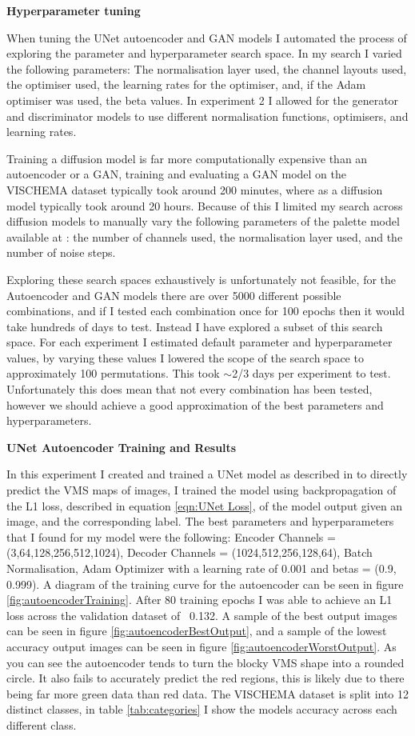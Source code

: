 \documentclass{UoYCSproject}
\begin{document}
\textbf{Hyperparameter tuning}

When tuning the UNet autoencoder and GAN models I automated the process of exploring the parameter and hyperparameter search space. In my search I varied the following parameters: The normalisation layer used, the channel layouts used, the optimiser used, the learning rates for the optimiser, and, if the Adam optimiser was used, the beta values. In experiment 2 I allowed for the generator and discriminator models to use different normalisation functions, optimisers, and learning rates. 

Training a diffusion model is far more computationally expensive than an autoencoder or a GAN, training and evaluating a GAN model on the VISCHEMA dataset typically took around 200 minutes, where as a diffusion model typically took around 20 hours. 
Because of this I limited my search across diffusion models to manually vary the following parameters of the palette model available at \cite{JanspiryPalette}: the number of channels used, the normalisation layer used, and the number of noise steps.

Exploring these search spaces exhaustively is unfortunately not feasible, for the Autoencoder and GAN models there are over 5000 different possible combinations, and if I tested each combination once for 100 epochs then it would take hundreds of days to test.
Instead I have explored a subset of this search space. For each experiment I estimated default parameter and hyperparameter values, by varying these values I lowered the scope of the search space to approximately 100 permutations. This took \(\sim\)2/3 days per experiment to test. Unfortunately this does mean that not every combination has been tested, however we should achieve a good approximation of the best parameters and hyperparameters.

\textbf{UNet Autoencoder Training and Results}

In this experiment I created and trained a UNet model as described in \cite{ronneberger2015unet} to directly predict the VMS maps of images, I trained the model using backpropagation of the L1 loss, described in equation \ref{eqn:UNet Loss}, of the model output given an image, and the corresponding label. The best parameters and hyperparameters that I found for my model were the following: Encoder Channels = (3,64,128,256,512,1024), Decoder Channels = (1024,512,256,128,64), Batch Normalisation, Adam Optimizer with a learning rate of 0.001 and betas = (0.9, 0.999). A diagram of the training curve for the autoencoder can be seen in figure \ref{fig:autoencoderTraining}. After 80 training epochs I was able to achieve an L1 loss across the validation dataset of ~0.132. A sample of the best output images can be seen in figure \ref{fig:autoencoderBestOutput}, and a sample of the lowest accuracy output images can be seen in figure \ref{fig:autoencoderWorstOutput}. As you can see the autoencoder tends to turn the blocky VMS shape into a rounded circle. It also fails to accurately predict the red regions, this is likely due to there being far more green data than red data. The VISCHEMA dataset is split into 12 distinct classes, in table \ref{tab:categories} I show the models accuracy across each different class.
\end{document}
